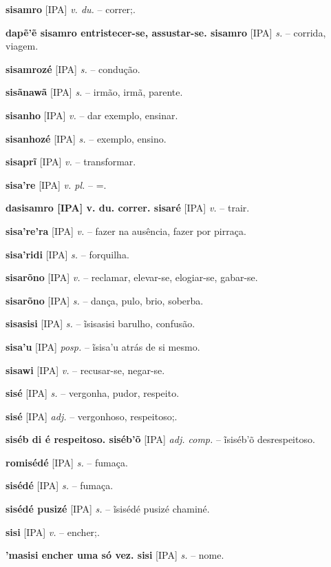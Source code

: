 \textbf{sisamro} [IPA] \textit{v. du.} -- correr;.

\textbf{dapẽ'ẽ sisamro entristecer-se, assustar-se. sisamro} [IPA] \textit{s.} -- corrida, viagem.

\textbf{sisamrozé} [IPA] \textit{s.} -- condução.

\textbf{sisãnawã} [IPA] \textit{s.} -- irmão, irmã, parente.

\textbf{sisanho} [IPA] \textit{v.} -- dar exemplo, ensinar.

\textbf{sisanhozé} [IPA] \textit{s.} -- exemplo, ensino.

\textbf{sisaprĩ} [IPA] \textit{v.} -- transformar.

\textbf{sisa're} [IPA] \textit{v. pl.} -- =.

\textbf{dasisamro [IPA] v. du. correr. sisaré} [IPA] \textit{v.} -- trair.

\textbf{sisa're'ra} [IPA] \textit{v.} -- fazer na ausência, fazer por pirraça.

\textbf{sisa'ridi} [IPA] \textit{s.} -- forquilha.

\textbf{sisarõno} [IPA] \textit{v.} -- reclamar, elevar-se, elogiar-se, gabar-se.

\textbf{sisarõno} [IPA] \textit{s.} -- dança, pulo, brio, soberba.

\textbf{sisasisi} [IPA] \textit{s.} -- ĩsisasisi barulho, confusão.

\textbf{sisa'u} [IPA] \textit{posp.} -- ĩsisa'u atrás de si mesmo.

\textbf{sisawi} [IPA] \textit{v.} -- recusar-se, negar-se.

\textbf{sisé} [IPA] \textit{s.} -- vergonha, pudor, respeito.

\textbf{sisé} [IPA] \textit{adj.} -- vergonhoso, respeitoso;.

\textbf{siséb di é respeitoso. siséb'õ} [IPA] \textit{adj. comp.} -- ĩsiséb'õ desrespeitoso.

\textbf{romisédé} [IPA] \textit{s.} -- fumaça. \href{https://xavante.pythonanywhere.com/static/dicionario/play.html?file=smoke(noun).wav}{\faHeadphones}

\textbf{sisédé} [IPA] \textit{s.} -- fumaça.

\textbf{sisédé pusizé} [IPA] \textit{s.} -- ĩsisédé pusizé chaminé.

\textbf{sisi} [IPA] \textit{v.} -- encher;.

\textbf{'masisi encher uma só vez. sisi} [IPA] \textit{s.} -- nome.

